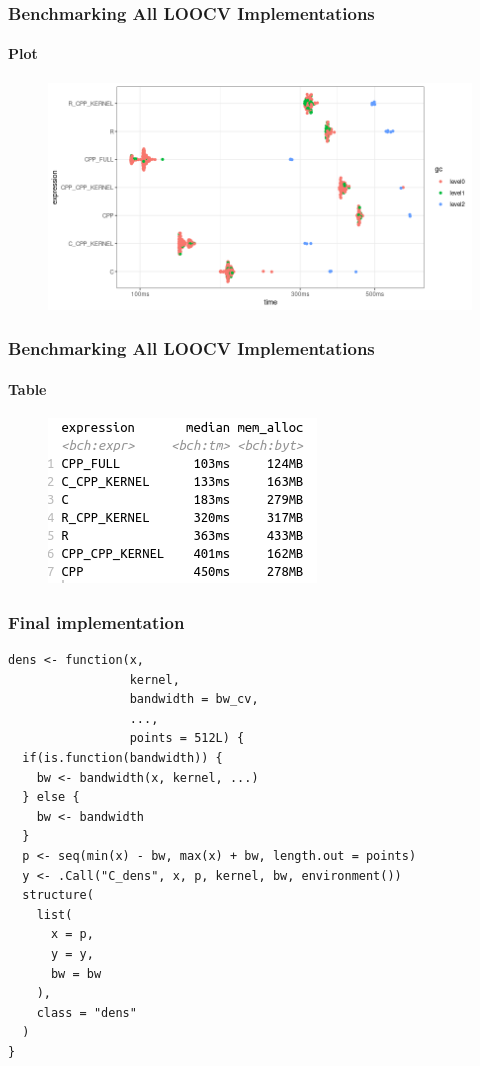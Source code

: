 \documentclass[aspectratio=169]{beamer}
\begin{document}
\begin{frame}
  \frametitle{Benchmarking All LOOCV Implementations}
  \framesubtitle{Plot}
  \begin{figure}
    \centering
    \includegraphics[scale = 0.5]{figure/CVsRcpBandwidth.png}
  \end{figure}
\end{frame}
\begin{frame}
  \frametitle{Benchmarking All LOOCV Implementations}
  \framesubtitle{Table}
  \begin{figure}
    \centering
    \includegraphics[scale = 0.7]{figure/CvsRCPPvsR_cv.png}
  \end{figure}
\end{frame}
\begin{frame}[fragile]
  \frametitle{Final implementation}
\begin{verbatim}
dens <- function(x,
                 kernel,
                 bandwidth = bw_cv,
                 ...,
                 points = 512L) {
  if(is.function(bandwidth)) {
    bw <- bandwidth(x, kernel, ...)
  } else {
    bw <- bandwidth
  }
  p <- seq(min(x) - bw, max(x) + bw, length.out = points)
  y <- .Call("C_dens", x, p, kernel, bw, environment())
  structure(
    list(
      x = p,
      y = y,
      bw = bw
    ),
    class = "dens"
  )
}
\end{verbatim}
\end{frame}
\end{document}
